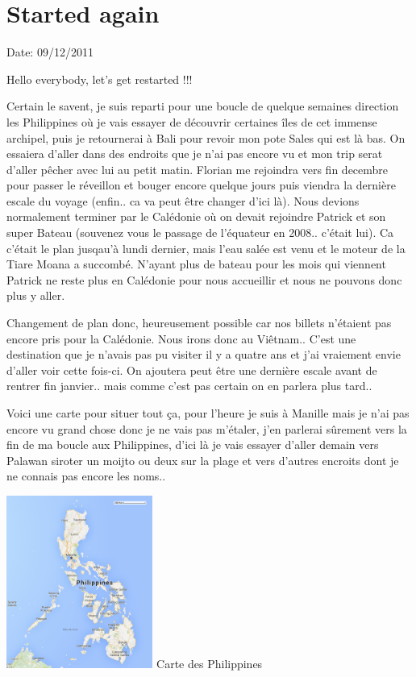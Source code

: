 \section{Started again}

Date: 09/12/2011

\begin{multicols}{2}

Hello everybody, let's get restarted !!!

Certain le savent, je suis reparti pour une boucle de quelque semaines direction les Philippines où je vais essayer de découvrir certaines îles de cet immense archipel, puis je retournerai à Bali pour revoir mon pote Sales qui est là bas. On essaiera d'aller dans des endroits que je n'ai pas encore vu et mon trip serat d'aller pêcher avec lui au petit matin. Florian me rejoindra vers fin decembre pour passer le réveillon et bouger encore quelque jours puis viendra la dernière escale du voyage (enfin.. ca va peut être changer d'ici là). Nous devions normalement terminer par le Calédonie où on devait rejoindre Patrick et son super Bateau (souvenez vous le passage de l'équateur en 2008.. c'était lui). Ca c'était le plan jusqau'à lundi dernier, mais l'eau salée est venu et le moteur de la Tiare Moana a succombé. N'ayant plus de bateau pour les mois qui viennent Patrick ne reste plus en Calédonie pour nous accueillir et nous ne pouvons donc plus y aller.

Changement de plan donc, heureusement possible car nos billets n'étaient pas encore pris pour la Calédonie. Nous irons donc au Viêtnam.. C'est une destination que je n'avais pas pu visiter il y a quatre ans et j'ai vraiement envie d'aller voir cette fois-ci. On ajoutera peut être une dernière escale avant de rentrer fin janvier.. mais comme c'est pas certain on en parlera plus tard..

Voici une carte pour situer tout ça, pour l'heure je suis à Manille mais je n'ai pas encore vu grand chose donc je ne vais pas m'étaler, j'en parlerai sûrement vers la fin de ma boucle aux Philippines, d'ici là je vais essayer d'aller demain vers Palawan siroter un moijto ou deux sur la plage et vers d'autres encroits dont je ne connais pas encore les noms..

\hspace*{-0.65cm}
\includegraphics[width=4.8cm]{articles/Started-again/philippines.png}
Carte des Philippines


\end{multicols}

